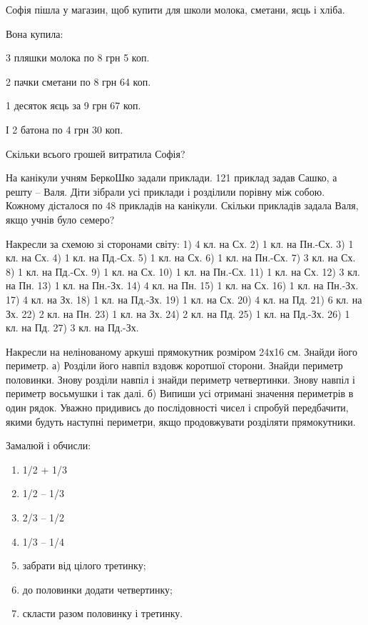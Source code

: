 \problem
Софія пішла у магазин, щоб купити для школи молока, сметани, яєць і хліба.

Вона купила:

3 пляшки молока по 8 грн 5 коп.

2 пачки сметани по 8 грн 64 коп.

1 десяток яєць за 9 грн 67 коп.

І 2 батона по 4 грн 30 коп.

Скільки всього грошей витратила Софія?


\problem
На канікули учням БеркоШко задали приклади.
121 приклад задав Сашко, а решту – Валя.
Діти зібрали усі приклади і розділили порівну між собою.
Кожному дісталося по 48 прикладів на канікули.
Скільки прикладів задала Валя, якщо учнів було семеро?


\problem
Накресли за схемою зі сторонами світу:
1) 4 кл. на Сх.
2) 1 кл. на Пн.-Сх.
3) 1 кл. на Сх.
4) 1 кл. на Пд.-Сх.
5) 1 кл. на Сх.
6) 1 кл. на Пн.-Сх.
7) 3 кл. на Сх.
8) 1 кл. на Пд.-Сх.
9) 1 кл. на Сх.
10) 1 кл. на Пн.-Сх.
11) 1 кл. на Сх.
12) 3 кл. на Пн.
13) 1 кл. на Пн.-Зх.
14) 4 кл. на Пн.
15) 1 кл. на Сх.
16) 1 кл. на Пн.-Зх.
17) 4 кл. на Зх.
18) 1 кл. на Пд.-Зх.
19) 1 кл. на Сх.
20) 4 кл. на Пд.
21) 6 кл. на Зх.
22) 2 кл. на Пн.
23) 1 кл. на Зх.
24) 2 кл. на Пд.
25) 1 кл. на Пд.-Зх.
26) 1 кл. на Пд.
27) 3 кл. на Пд.-Зх.


\problem
Накресли на нелінованому аркуші прямокутник розміром 24х16 см.
Знайди його периметр.
а) Розділи його навпіл вздовж коротшої сторони.
Знайди периметр половинки.
Знову розділи навпіл і знайди периметр четвертинки.
Знову навпіл і периметр восьмушки і так далі.
б) Випиши усі отримані значення периметрів в один рядок.
Уважно придивись до послідовності чисел і спробуй передбачити,
якими будуть наступні периметри, якщо продовжувати розділяти прямокутники.


\problem
Замалюй і обчисли:
\begin{enumerate}
    \item 1/2 + 1/3 
    \item 1/2 – 1/3 
    \item 2/3 – 1/2 
    \item 1/3 – 1/4 
    \item забрати від цілого третинку;
    \item до половинки додати четвертинку;
    \item скласти разом половинку і третинку.
\end{enumerate}


